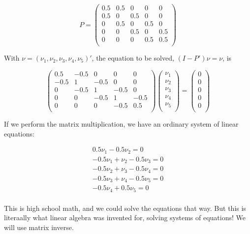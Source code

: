 \documentclass[
  letterpaper,
  DIV=11,
  numbers=noendperiod,
  oneside]{scrreprt}
\begin{document}
\[
P =
\left (
\begin{array}{rrrrr}
0.5 & 0.5 & 0 & 0 & 0\\
0.5 & 0 & 0.5 & 0 & 0\\
0 & 0.5 & 0 & 0.5 & 0\\
0 & 0 & 0.5 & 0 & 0.5\\
0 & 0 & 0 & 0.5 & 0.5 \\
\end{array}
\right )
\]

With \(\nu = (\nu_1,\nu_2,\nu_3,\nu_4,\nu_5)'\), the equation to be
solved, \((I-P') \nu = \nu\), is

\[
\left (
\begin{array}{rrrrr}
0.5 & -0.5 & 0 & 0 & 0 \\
-0.5 & 1 & -0.5 & 0 & 0 \\
0 & -0.5 & 1 & -0.5 & 0 \\
0 & 0 & -0.5 & 1 & -0.5 \\
0 & 0 & 0 & -0.5 & 0.5 \\
\end{array}
\right )
\left (
\begin{array}{rrrrr}
\nu_1 \\
\nu_2 \\
\nu_3 \\
\nu_4 \\
\nu_5 \\
\end{array}
\right ) = 
\left (
\begin{array}{rrrrr}
0 \\
0 \\
0 \\
0 \\
0 \\
\end{array}
\right ) 
\]

If we perform the matrix multiplication, we have an ordinary system of
linear equations:

\[
\begin{array}{rrrrr}
0.5 \nu_1 - 0.5 \nu_2 = 0 \\
-0.5 \nu_1 + \nu_2 - 0.5 \nu_3 = 0 \\
-0.5 \nu_2 + \nu_3 - 0.5 \nu_4 = 0 \\
-0.5 \nu_3 + \nu_4 - 0.5 \nu_5 = 0 \\
-0.5 \nu_4 + 0.5 \nu_5 = 0 \\
\end{array}
\]

This is high school math, and we could solve the equations that way. But
this is literaally what linear algebra was invented for, solving systems
of equations! We will use matrix inverse.
\end{document}
